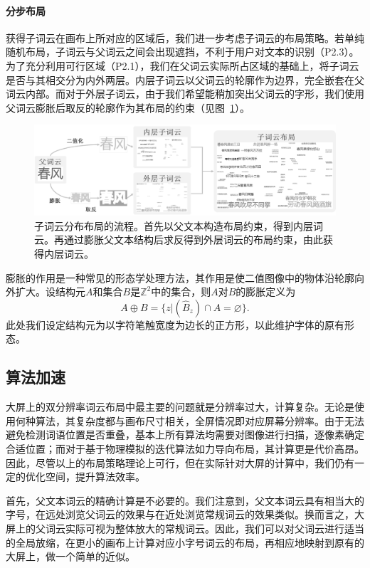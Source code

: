 \paragraph{分步布局}
获得子词云在画布上所对应的区域后，我们进一步考虑子词云的布局策略。若单纯随机布局，子词云与父词云之间会出现遮挡，不利于用户对文本的识别（P2.3）。为了充分利用可行区域（P2.1），我们在父词云实际所占区域的基础上，将子词云是否与其相交分为内外两层。内层子词云以父词云的轮廓作为边界，完全嵌套在父词云内部。而对于外层子词云，由于我们希望能稍加突出父词云的字形，我们使用父词云膨胀后取反的轮廓作为其布局的约束（见图~\ref{fig:sublayout}）。
\begin{figure}[htbp]
	\centering
	\includegraphics[width=\textwidth]{figures/sublayout.png}
	\caption{子词云分布布局的流程。首先以父文本构造布局约束，得到内层词云。再通过膨胀父文本结构后求反得到外层词云的布局约束，由此获得内层词云。}
	\label{fig:sublayout}
\end{figure}

膨胀的作用是一种常见的形态学处理方法，其作用是使二值图像中的物体沿轮廓向外扩大。设结构元$A$和集合$B$是$\mathbb{Z}^2$中的集合，则$A$对$B$的膨胀定义为
\begin{equation*}
A \oplus B = \{z|(\hat{B}_{z})\cap A = \varnothing\}.
\end{equation*}
此处我们设定结构元为以字符笔触宽度为边长的正方形，以此维护字体的原有形态。

\subsection{算法加速}
大屏上的双分辨率词云布局中最主要的问题就是分辨率过大，计算复杂。无论是使用何种算法，其复杂度都与画布尺寸相关，全屏情况即对应屏幕分辨率。由于无法避免检测词语位置是否重叠，基本上所有算法均需要对图像进行扫描，逐像素确定合适位置；而对于基于物理模拟的迭代算法如力导向布局，其计算更是代价高昂。因此，尽管以上的布局策略理论上可行，但在实际针对大屏的计算中，我们仍有一定的优化空间，提升算法效率。

首先，父文本词云的精确计算是不必要的。我们注意到，父文本词云具有相当大的字号，在远处浏览父词云的效果与在近处浏览常规词云的效果类似。换而言之，大屏上的父词云实际可视为整体放大的常规词云。因此，我们可以对父词云进行适当的全局放缩，在更小的画布上计算对应小字号词云的布局，再相应地映射到原有的大屏上，做一个简单的近似。

